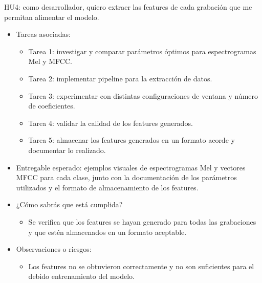 \documentclass[
11pt, %
]{charter}
\begin{document}
HU4: como desarrollador, quiero extraer las features de cada grabación que me permitan alimentar el modelo.
\begin{itemize}
  \item Tareas asociadas:
    \begin{itemize}
      \item Tarea 1: investigar y comparar parámetros óptimos para espectrogramas Mel y MFCC.
      \item Tarea 2: implementar pipeline para la extracción de datos.
      \item Tarea 3: experimentar con distintas configuraciones de ventana y número de coeficientes.
      \item Tarea 4: validar la calidad de los features generados.
      \item Tarea 5: almacenar los features generados en un formato acorde y documentar lo realizado.
    \end{itemize}
  \item Entregable esperado: ejemplos visuales de espectrogramas Mel y vectores MFCC para cada clase, junto con la documentación de los parámetros utilizados
  y el formato de almacenamiento de los features.
  \item ¿Cómo sabrás que está cumplida?
    \begin{itemize}
      \item Se verifica que los features se hayan generado para todas las grabaciones y que estén almacenados en un formato aceptable.
    \end{itemize}
  \item Observaciones o riesgos:
    \begin{itemize}
      \item Los features no se obtuvieron correctamente y no son suficientes para el debido entrenamiento del modelo.
    \end{itemize}
\end{itemize}
\end{document}
